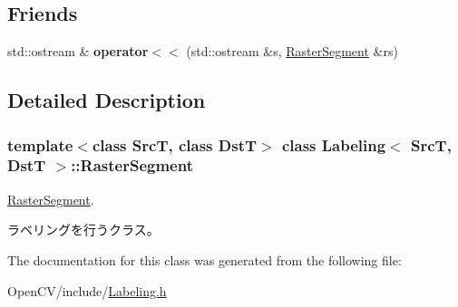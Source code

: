 \subsection*{Friends}
\begin{DoxyCompactItemize}
\item 
\hypertarget{class_labeling_1_1_raster_segment_ad69e5ef7abb3c0a38b8d66e137e05e79}{}\label{class_labeling_1_1_raster_segment_ad69e5ef7abb3c0a38b8d66e137e05e79} 
std\+::ostream \& {\bfseries operator$<$$<$} (std\+::ostream \&s, \hyperlink{class_labeling_1_1_raster_segment}{Raster\+Segment} \&rs)
\end{DoxyCompactItemize}


\subsection{Detailed Description}
\subsubsection*{template$<$class SrcT, class DstT$>$\newline
class Labeling$<$ Src\+T, Dst\+T $>$\+::\+Raster\+Segment}

\hyperlink{class_labeling_1_1_raster_segment}{Raster\+Segment}. 

ラベリングを行うクラス。 

The documentation for this class was generated from the following file\+:\begin{DoxyCompactItemize}
\item 
Open\+C\+V/include/\hyperlink{_labeling_8h}{Labeling.\+h}\end{DoxyCompactItemize}

